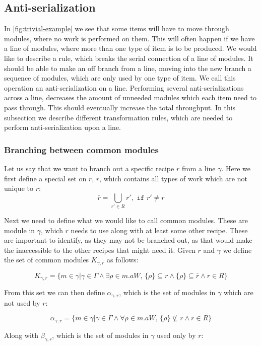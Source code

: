 \subsection{Anti-serialization}
In \cref{fig:trivial-example} we see that some items will have to move through modules, where no work is performed on them. This will often happen if we have a line of modules, where more than one type of item is to be produced. We would like to describe a rule, which breaks the serial connection of a line of modules. It should be able to make an off branch from a line, moving into the new branch a sequence of modules, which are only used by one type of item. We call this operation an anti-serialization on a line. Performing several anti-serializations across a line, decreases the amount of unneeded modules which each item need to pass through. This should eventually increase the total throughput. In this subsection we describe different transformation rules, which are needed to perform anti-serialization upon a line.

\subsubsection{Branching between common modules}
Let us say that we want to branch out a specific recipe $r$ from a line $\gamma$. Here we first define a special set on $r$, $\bar{r}$, which contains all types of work which are not unique to $r$:
\[\bar{r} = \bigcup_{r' \in R}r', \texttt{ if } r' \neq r\]

Next we need to define what we would like to call common modules. These are module in $\gamma$, which $r$ needs to use along with at least some other recipe. These are important to identify, as they may not be branched out, as that would make the inaccessible to the other recipes that might need it.  Given $r$ and $\gamma$ we define the set of common modules $K_{\gamma ,r}$ as follows:

\[K_{\gamma ,r} = \{m \in \gamma | \gamma \in \Gamma \land \exists \rho \in m.aW,\, \{\rho\} \subseteq r \land \{\rho\} \subseteq \bar{r} \land r \in R\}\]

From this set we can then define $\alpha_{\gamma ,r}$, which is the set of modules in $\gamma$ which are not used by $r$: 

\[\alpha_{\gamma ,r}  = \{m \in \gamma | \gamma \in \Gamma \land \forall \rho \in m.aW,\, \{\rho\} \nsubseteq r \land r \in R\}\]

Along with $\beta_{\gamma ,r}$, which is the set of modules in $\gamma$ used only by $r$:

